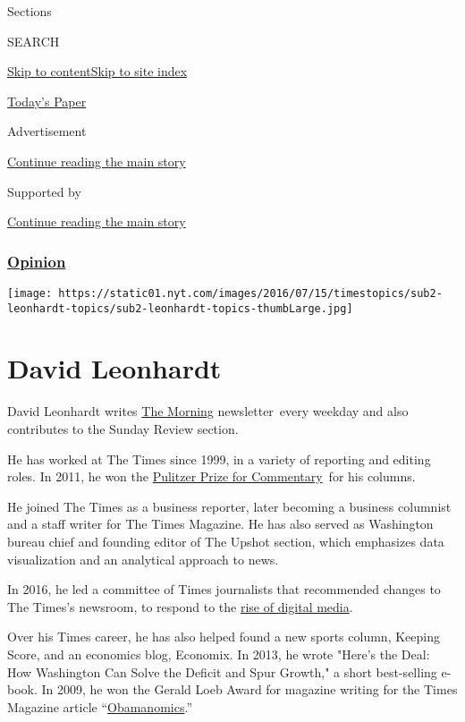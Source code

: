 Sections

SEARCH

\protect\hyperlink{site-content}{Skip to
content}\protect\hyperlink{site-index}{Skip to site index}

\href{https://myaccount.nytimes.com/auth/login?response_type=cookie\&client_id=vi}{}

\href{https://www.nytimes.com/section/todayspaper}{Today's Paper}

Advertisement

\protect\hyperlink{after-top}{Continue reading the main story}

Supported by

\protect\hyperlink{after-sponsor}{Continue reading the main story}

\hypertarget{opinion}{%
\subsubsection{\texorpdfstring{\href{/section/opinion}{Opinion}}{Opinion}}\label{opinion}}

\texttt{[image: https://static01.nyt.com/images/2016/07/15/timestopics/sub2-leonhardt-topics/sub2-leonhardt-topics-thumbLarge.jpg]}

\hypertarget{david-leonhardt}{%
\section{David Leonhardt}\label{david-leonhardt}}

David Leonhardt writes
\href{https://www.nytimes.com/series/us-morning-briefing}{The Morning}
newsletter~every weekday and also contributes to the Sunday Review
section.

He has worked at The Times since 1999, in a variety of reporting and
editing roles. In 2011, he won the
\href{https://www.pulitzer.org/winners/david-leonhardt}{Pulitzer Prize
for Commentary}~for his columns.

He joined The Times as a business reporter, later becoming a business
columnist and a staff writer for The Times Magazine. He has also served
as Washington bureau chief and founding editor of The Upshot section,
which emphasizes data visualization and an analytical approach to news.

In 2016, he led a committee of Times journalists that recommended
changes to The Times's newsroom, to respond to the
\href{https://www.nytimes.com/projects/2020-report/index.html}{rise of
digital media}.~

Over his Times career, he has also helped found a new sports column,
Keeping Score, and an economics blog, Economix. In 2013, he wrote
"Here's the Deal: How Washington Can Solve the Deficit and Spur Growth,"
a short best-selling e-book. In 2009, he won the Gerald Loeb Award for
magazine writing for the Times Magazine article
``\href{https://www.nytimes.com/2008/08/24/magazine/24Obamanomics-t.html}{Obamanomics}.''


